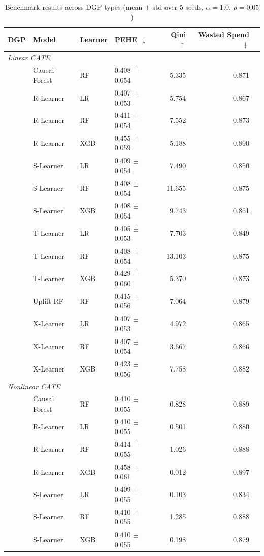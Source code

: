 \begin{table}[t]
\centering
\caption{Benchmark results across DGP types (mean $\pm$ std over 5 seeds, $\alpha=1.0$, $\rho=0.05$)}
\label{tab:main_results}
\small
\begin{tabular}{llllrrr}
\toprule
DGP & Model & Learner & PEHE $\downarrow$ & Qini $\uparrow$ & Wasted Spend $\downarrow$ \\
\midrule
\multicolumn{6}{l}{\textit{Linear CATE}} \\
  & Causal Forest & RF & 0.408 $\pm$ 0.054 & 5.335 & 0.871 \\
  & R-Learner & LR & 0.407 $\pm$ 0.053 & 5.754 & 0.867 \\
  & R-Learner & RF & 0.411 $\pm$ 0.054 & 7.552 & 0.873 \\
  & R-Learner & XGB & 0.455 $\pm$ 0.059 & 5.188 & 0.890 \\
  & S-Learner & LR & 0.409 $\pm$ 0.054 & 7.490 & 0.850 \\
  & S-Learner & RF & 0.408 $\pm$ 0.054 & 11.655 & 0.875 \\
  & S-Learner & XGB & 0.408 $\pm$ 0.054 & 9.743 & 0.861 \\
  & T-Learner & LR & 0.405 $\pm$ 0.053 & 7.703 & 0.849 \\
  & T-Learner & RF & 0.408 $\pm$ 0.054 & 13.103 & 0.875 \\
  & T-Learner & XGB & 0.429 $\pm$ 0.060 & 5.370 & 0.873 \\
  & Uplift RF & RF & 0.415 $\pm$ 0.056 & 7.064 & 0.879 \\
  & X-Learner & LR & 0.407 $\pm$ 0.053 & 4.972 & 0.865 \\
  & X-Learner & RF & 0.407 $\pm$ 0.054 & 3.667 & 0.866 \\
  & X-Learner & XGB & 0.423 $\pm$ 0.056 & 7.758 & 0.882 \\
\midrule
\multicolumn{6}{l}{\textit{Nonlinear CATE}} \\
  & Causal Forest & RF & 0.410 $\pm$ 0.055 & 0.828 & 0.889 \\
  & R-Learner & LR & 0.410 $\pm$ 0.055 & 0.501 & 0.880 \\
  & R-Learner & RF & 0.414 $\pm$ 0.055 & 1.026 & 0.888 \\
  & R-Learner & XGB & 0.458 $\pm$ 0.061 & -0.012 & 0.897 \\
  & S-Learner & LR & 0.409 $\pm$ 0.055 & 0.103 & 0.834 \\
  & S-Learner & RF & 0.410 $\pm$ 0.055 & 1.285 & 0.888 \\
  & S-Learner & XGB & 0.410 $\pm$ 0.055 & 0.198 & 0.879 \\

\end{tabular}
\end{table}
